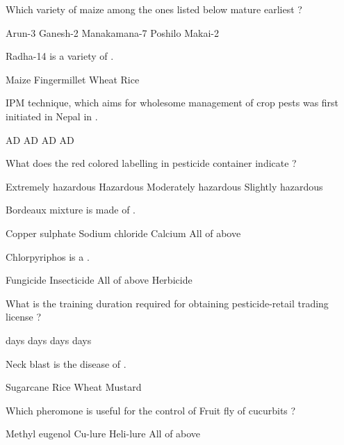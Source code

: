 \begin{questions}
\question Which variety of maize among the ones listed below mature earliest ?
  \begin{choices}
  \choice Arun-3
  \choice Ganesh-2
  \choice Manakamana-7
  \choice Poshilo Makai-2
  \end{choices}

\question Radha-14 is a variety of \fillin[][3cm].
  \begin{choices}
  \choice Maize
  \choice Fingermillet
  \choice Wheat
  \CorrectChoice Rice
  \end{choices}

\question IPM technique, which aims for wholesome management of crop pests was first initiated in Nepal in \fillin[][3cm].
  \begin{choices}
   AD
   AD
   AD
   AD
  \end{choices}

\question What does the red colored labelling in pesticide container indicate ?
  \begin{choices}
  \CorrectChoice Extremely hazardous
  \choice Hazardous
  \choice Moderately hazardous
  \choice Slightly hazardous
  \end{choices}

\question Bordeaux mixture is made of \fillin[][3cm].
  \begin{choices}
  \CorrectChoice Copper sulphate
  \choice Sodium chloride
  \choice Calcium
  \choice All of above
  \end{choices}

\question Chlorpyriphos is a \fillin[][3cm].
  \begin{choices}
  \choice Fungicide
  \CorrectChoice Insecticide
  \choice All of above
  \choice Herbicide
  \end{choices}

\question What is the training duration required for obtaining pesticide-retail trading license ?
  \begin{choices}
   days
   days
   days
   days
  \end{choices}

\question Neck blast is the disease of \fillin[][3cm].
  \begin{choices}
  \choice Sugarcane
  \CorrectChoice Rice
  \choice Wheat
  \choice Mustard
  \end{choices}

\question Which pheromone is useful for the control of Fruit fly of cucurbits ?
  \begin{choices}
  \choice Methyl eugenol
  \choice Cu-lure
  \choice Heli-lure
  \choice All of above
  \end{choices}


\end{questions}
